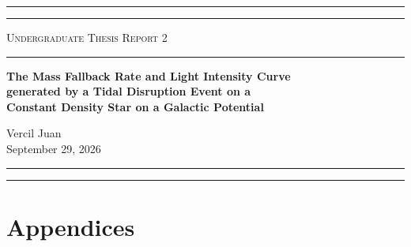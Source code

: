 \documentclass[10pt,a4paper]{article}
\begin{document}
	\begin{center}
	  {\Large
		\hrule\vspace{3pt}\hrule\vspace{0.5em}
		\textsc{Undergraduate Thesis Report 2}\vspace{1em}
		\hrule\vspace{1em}
		\textbf{
		  The Mass Fallback Rate and Light Intensity Curve\\
		  generated by a Tidal Disruption Event on a\\
		  Constant Density Star on a Galactic Potential\\[0.5cm]
		}
	  }
	  {\large
		Vercil Juan\\[1em]
		September 29, 2026\vspace{1em}
		\hrule\vspace{3pt}
		\hrule\vspace{0.5cm}
	  }
	\end{center}

	\newpage
	\section*{Appendices}
	
	
\end{document}
